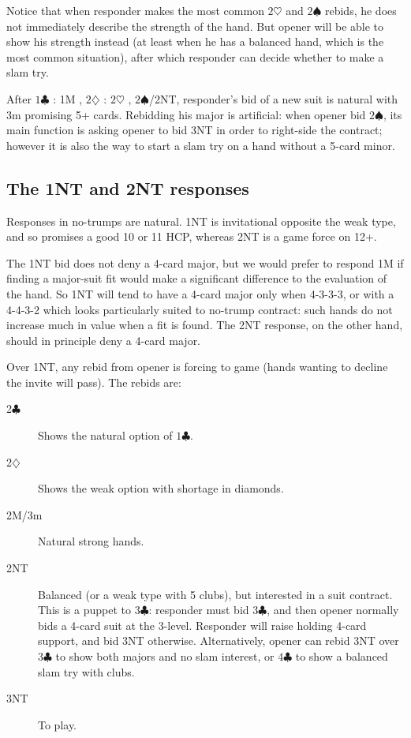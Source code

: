\documentclass{article}
\newcommand{\sz}{\spadesuit}
\newcommand{\hz}{\heartsuit}
\newcommand{\dz}{\diamondsuit}
\newcommand{\cz}{\clubsuit}
\begin{document}
Notice that when responder makes the most common $2\hz$ and $2\sz$ rebids, he does not immediately describe the strength of the hand. But opener will be able to show his strength instead (at least when he has a balanced hand, which is the most common situation), after which responder can decide whether to make a slam try.

After $1\cz$ : 1M , $2\dz$ : $2\hz$ , $2\sz$/2NT, responder's bid of a new suit is natural with 3m promising 5+ cards. Rebidding his major is artificial: when opener bid $2\sz$, its main function is asking opener to bid 3NT in order to right-side the contract; however it is also the way to start a slam try on a hand without a 5-card minor.

\subsection{The 1NT and 2NT responses}

Responses in no-trumps are natural. 1NT is invitational opposite the weak type, and so promises a good 10 or 11 HCP, whereas 2NT is a game force on 12+.

The 1NT bid does not deny a 4-card major, but we would prefer to respond 1M if finding a major-suit fit would make a significant difference to the evaluation of the hand. So 1NT will tend to have a 4-card major only when 4-3-3-3, or with a 4-4-3-2 which looks particularly suited to no-trump contract: such hands do not increase much in value when a fit is found. The 2NT response, on the other hand, should in principle deny a 4-card major.

Over 1NT, any rebid from opener is forcing to game (hands wanting to decline the invite will pass). The rebids are:
\begin{description}
\item[2$\cz$] Shows the natural option of $1\cz$.
\item[2$\dz$] Shows the weak option with shortage in diamonds.
\item[2M/3m] Natural strong hands.
\item[2NT] Balanced (or a weak type with 5 clubs), but interested in a suit contract. This is a puppet to $3\cz$: responder must bid $3\cz$, and then opener normally bids a 4-card suit at the 3-level. Responder will raise holding 4-card support, and bid 3NT otherwise. Alternatively, opener can rebid 3NT over $3\cz$ to show both majors and no slam interest, or $4\cz$ to show a balanced slam try with clubs.
\item[3NT] To play.
\end{description}
\end{document}
